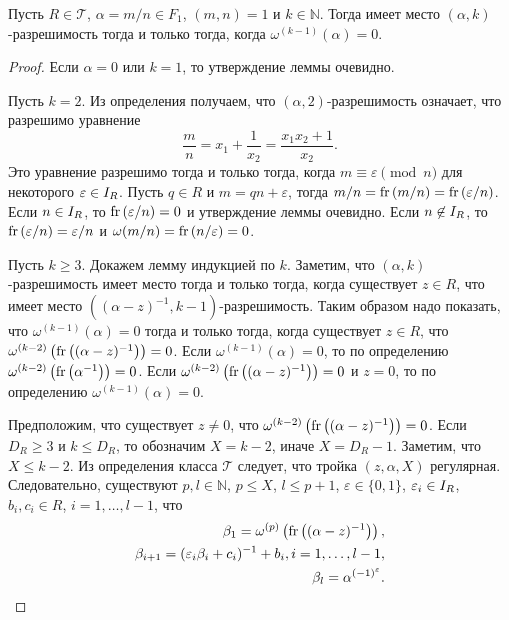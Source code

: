 \documentclass[_00_dissertation.tex]{subfiles}
\begin{document}
\begin{lemma}\label{lemma:omega_and_euclidean_algorithm}
    Пусть $R \in \mathcal{T}$, $\alpha = m/n \in F_1$, $(m, n) = 1$ и $k \in \mathbb{N}$.
    Тогда имеет место $(\alpha, k)$-разрешимость тогда и только тогда, когда $\omega^{(k-1)}(\alpha) = 0$.
\end{lemma}
\begin{proof}
    Если $\alpha = 0$ или $k = 1$, то утверждение леммы очевидно.

    Пусть $k = 2$.
    Из определения получаем, что $(\alpha, 2)$-разрешимость означает, что разрешимо уравнение
    \begin{equation*}
        \frac{m}{n} = x_1 + \frac{1}{x_2} = \frac{x_1 x_2 + 1}{x_2}.
    \end{equation*}
    Это уравнение разрешимо тогда и только тогда, когда $m \equiv \varepsilon \pmod{n}$ для некоторого $\varepsilon \in I_{R}$.
    Пусть $q \in R$ и $m = q n + \varepsilon$, тогда $m/n = \textrm{fr}\left(m/n\right) = \textrm{fr}\left(\varepsilon/n\right)$.
    Если $n \in I_{R}$, то $\textrm{fr}\left(\varepsilon/n\right) = 0$ и утверждение леммы очевидно.
    Если $n \not\in I_{R}$, то $\textrm{fr}\left(\varepsilon/n\right) = \varepsilon/n$ и $\omega(m/n) = \textrm{fr}\left(n/\varepsilon\right) = 0$.

    Пусть $k \ge 3$.
    Докажем лемму индукцией по $k$.
    Заметим, что $(\alpha, k)$-разрешимость имеет место тогда и только тогда, когда существует $z \in R$, что имеет место $\left((\alpha - z)^{-1}, k-1\right)$-разрешимость.
    Таким образом надо показать, что $\omega^{(k-1)}(\alpha) = 0$ тогда и только тогда, когда существует $z \in R$, что $\omega^{(k-2)}\left(\textrm{fr}\left((\alpha - z)^{-1}\right)\right) = 0$.
    Если $\omega^{(k-1)}(\alpha) = 0$, то по определению $\omega^{(k-2)}\left(\textrm{fr}\left(\alpha^{-1}\right)\right) = 0$.
    Если $\omega^{(k-2)}\left(\textrm{fr}\left((\alpha - z)^{-1}\right)\right) = 0$ и $z = 0$, то по определению $\omega^{(k-1)}(\alpha) = 0$.

    Предположим, что существует $z \neq 0$, что $\omega^{(k-2)}\left(\textrm{fr}\left((\alpha - z)^{-1}\right)\right) = 0$.
    Если $D_R \ge 3$ и $k \le D_R$, то обозначим $X = k-2$, иначе $X = D_R - 1$.
    Заметим, что $X \le k-2$.
    Из определения класса $\mathcal{T}$ следует, что тройка $(z, \alpha, X)$ регулярная.
    Следовательно, существуют $p, l \in \mathbb{N}$, $p \le X$, $l \le p+1$, $\varepsilon \in \{0, 1\}$, $\varepsilon_i \in I_{R}$, $b_i, c_i \in R$, $i = 1, \dots, l-1$, что
    \begin{equation*}
        \begin{split}
            \beta_1 = \omega^{(p)}\left(\textrm{fr}\left((\alpha - z)^{-1}\right)\right),\\
            \beta_{i+1} = (\varepsilon_i \beta_i + c_i)^{-1} + b_i, i = 1, \dots, l-1,\\
            \beta_{l} = \alpha^{(-1)^{\varepsilon}}.
        \end{split}
    \end{equation*}


\end{proof}
\end{document}
